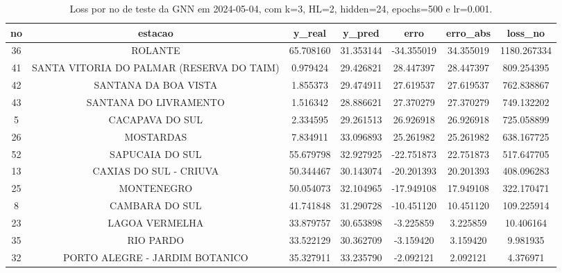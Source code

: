 \begin{table}[h]
\centering
\caption{Loss por no de teste da GNN em 2024-05-04, com k=3, HL=2, hidden=24, epochs=500 e lr=0.001.}
\label{tab:gnn_loss_k3_hl2_h24_e500_d20240504}
\begin{tabular}{ccccccc}
\toprule
no & estacao & y\_real & y\_pred & erro & erro\_abs & loss\_no \\
\midrule
36 & ROLANTE & 65.708160 & 31.353144 & -34.355019 & 34.355019 & 1180.267334 \\
41 & SANTA VITORIA DO PALMAR (RESERVA DO TAIM) & 0.979424 & 29.426821 & 28.447397 & 28.447397 & 809.254395 \\
42 & SANTANA DA BOA VISTA & 1.855373 & 29.474911 & 27.619537 & 27.619537 & 762.838867 \\
43 & SANTANA DO LIVRAMENTO & 1.516342 & 28.886621 & 27.370279 & 27.370279 & 749.132202 \\
5 & CACAPAVA DO SUL & 2.334595 & 29.261513 & 26.926918 & 26.926918 & 725.058899 \\
26 & MOSTARDAS & 7.834911 & 33.096893 & 25.261982 & 25.261982 & 638.167725 \\
52 & SAPUCAIA DO SUL & 55.679798 & 32.927925 & -22.751873 & 22.751873 & 517.647705 \\
13 & CAXIAS DO SUL - CRIUVA & 50.344467 & 30.143074 & -20.201393 & 20.201393 & 408.096283 \\
25 & MONTENEGRO & 50.054073 & 32.104965 & -17.949108 & 17.949108 & 322.170471 \\
8 & CAMBARA DO SUL & 41.741848 & 31.290728 & -10.451120 & 10.451120 & 109.225914 \\
23 & LAGOA VERMELHA & 33.879757 & 30.653898 & -3.225859 & 3.225859 & 10.406164 \\
35 & RIO PARDO & 33.522129 & 30.362709 & -3.159420 & 3.159420 & 9.981935 \\
32 & PORTO ALEGRE - JARDIM BOTANICO & 35.327911 & 33.235790 & -2.092121 & 2.092121 & 4.376971 \\
\bottomrule
\end{tabular}
\end{table}
